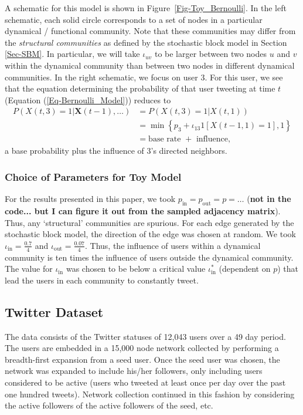 \documentclass[12pt]{article}
\begin{document}
A schematic for this model is shown in Figure~\ref{Fig-Toy_Bernoulli}. In the left schematic, each solid circle corresponds to a set of nodes in a particular dynamical / functional community. Note that these communities may differ from the \emph{structural communities} as defined by the stochastic block model in Section \ref{Sec-SBM}. In particular, we will take $\iota_{uv}$ to be larger between two nodes $u$ and $v$ within the dynamical community than between two nodes in different dynamical communities. In the right schematic, we focus on user 3. For this user, we see that the equation determining the probability of that user tweeting at time $t$ (Equation (\ref{Eq-Bernoulli_Model})) reduces to
\begin{align}
	P(X(t, 3) = 1 | \mathbf{X}(t-1), \ldots) &= P(X(t,3) = 1 | X(t, 1)) \\
		&= \min \left\{p_{3} + \iota_{13} 1[X(t-1, 1) = 1], 1\right\}\\
		&= \text{base rate } + \text{ influence,}
\end{align}
a base probability plus the influence of 3's directed neighbors.

\subsubsection{Choice of Parameters for Toy Model}

For the results presented in this paper, we took $p_{\text{in}} = p_{\text{out}} = p = \ldots$ (\textbf{not in the code... but I can figure it out from the sampled adjacency matrix}). Thus, any `structural' communities are spurious. For each edge generated by the stochastic block model, the direction of the edge was chosen at random. We took $\iota_{\text{in}} = \frac{0.7}{4}$ and $\iota_{\text{out}} = \frac{0.07}{4}$. Thus, the influence of users within a dynamical community is ten times the influence of users outside the dynamical community. The value for $\iota_{\text{in}}$ was chosen to be below a critical value $\iota^{*}_{\text{in}}$ (dependent on $p$) that lead the users in each community to constantly tweet.

\subsection{Twitter Dataset}

The data consists of the Twitter statuses of 12,043 users over a 49 day period. The users are embedded in a 15,000 node network collected by performing a breadth-first expansion from a seed user. Once the seed user was chosen, the network was expanded to include his/her followers, only including users considered to be active (users who tweeted at least once per day over the past one hundred tweets). Network collection continued in this fashion by considering the active followers of the active followers of the seed, etc.
\end{document}
